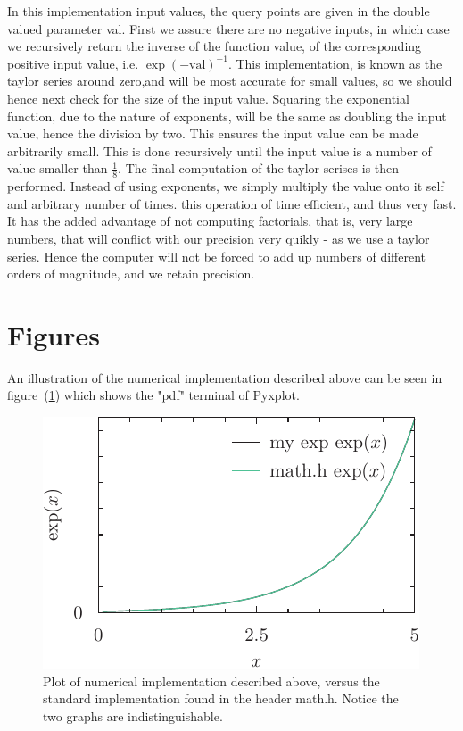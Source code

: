 \documentclass[twocolumn]{article}
\begin{document}
In this implementation input values, the query points are given in the double valued parameter val.
First we assure there are no negative inputs, in which case we recursively return the inverse of the function value, of the corresponding positive input value, i.e. $\exp \left( -\text{val} \right)^{-1}$. This implementation, is known as the taylor series around zero,and will be most accurate for small values, so we should hence next check for the size of the input value. 
Squaring the exponential function, due to the nature of exponents, will be the same as doubling the input value, hence the division by two. This ensures the input value can be made arbitrarily small. 
This is done recursively until the input value is a number of value smaller than $\frac18$. 
The final computation of the taylor serises is then performed. Instead of using exponents, we simply multiply the value onto it self and arbitrary number of times. this operation of time efficient, and thus very fast. It has the added advantage of not computing factorials, that is, very large numbers, that will conflict
with our precision very quikly - as we use a taylor series. Hence the computer will not be forced to add up numbers of different orders of magnitude, and we retain precision.

\section{Figures}
An illustration of the numerical implementation described above can be seen in figure~(\ref{fig:pyxplot}) which 
shows the "pdf" terminal of Pyxplot.


\begin{figure}[H]
	\includegraphics{exp_plot.pdf}
	\caption{ Plot of numerical implementation described above, versus the standard implementation found in the header math.h. Notice the two graphs are indistinguishable.}
	\label{fig:pyxplot}
\end{figure}
\end{document}

